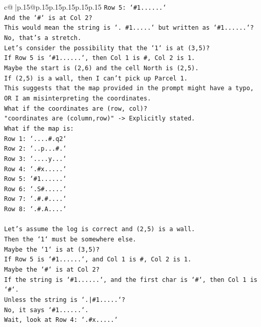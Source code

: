 \documentclass{article}
\begin{document}
{\begin{supertabular}{c@{$\;$}|p{.15\linewidth}@{}p{.15\linewidth}p{.15\linewidth}p{.15\linewidth}p{.15\linewidth}p{.15\linewidth}}
{{{\texttt{Row 5: `\#1......`} \\
\texttt{And the `\#` is at Col 2?} \\
\texttt{This would mean the string is `. \#1.....` but written as `\#1......`?} \\
\texttt{No, that's a stretch.} \\
\texttt{Let's consider the possibility that the `1` is at (3,5)?} \\
\texttt{If Row 5 is `\#1......`, then Col 1 is \#, Col 2 is 1.} \\
\texttt{Maybe the start is (2,6) and the cell North is (2,5).} \\
\texttt{If (2,5) is a wall, then I can't pick up Parcel 1.} \\
\texttt{This suggests that the map provided in the prompt might have a typo, OR I am misinterpreting the coordinates.} \\
\texttt{What if the coordinates are (row, col)?} \\
\texttt{"coordinates are (column,row)" {-}> Explicitly stated.} \\
\texttt{What if the map is:} \\
\texttt{Row 1: `....\#.q2`} \\
\texttt{Row 2: `..p...\#.`} \\
\texttt{Row 3: `....y...`} \\
\texttt{Row 4: `.\#x.....`} \\
\texttt{Row 5: `\#1......`} \\
\texttt{Row 6: `.S\#.....`} \\
\texttt{Row 7: `.\#.\#....`} \\
\texttt{Row 8: `.\#.A....`} \\
\\ 
\texttt{Let's assume the log is correct and (2,5) is a wall.} \\
\texttt{Then the `1` must be somewhere else.} \\
\texttt{Maybe the `1` is at (3,5)?} \\
\texttt{If Row 5 is `\#1......`, and Col 1 is \#, Col 2 is 1.} \\
\texttt{Maybe the `\#` is at Col 2?} \\
\texttt{If the string is `\#1......`, and the first char is `\#`, then Col 1 is `\#`.} \\
\texttt{Unless the string is `.|\#1.....`?} \\
\texttt{No, it says `\#1......`.} \\
\texttt{Wait, look at Row 4: `.\#x.....`} \\
}}}
\end{supertabular}}
\end{document}
